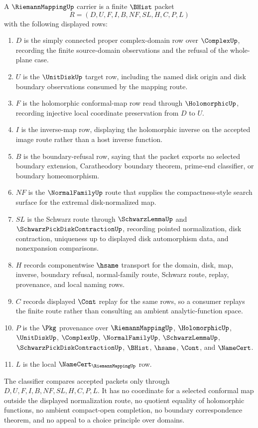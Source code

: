 \begin{definition}
\label{def:riemann-mapping-carrier}
A $\RiemannMappingUp$ carrier is a finite $\BHist$ packet
$$
R=(D,U,F,I,B,NF,SL,H,C,P,L)
$$
with the following displayed rows:
\begin{enumerate}
\item $D$ is the simply connected proper complex-domain row over $\ComplexUp$, recording the finite source-domain observations and the refusal of the whole-plane case.
\item $U$ is the $\UnitDiskUp$ target row, including the named disk origin and disk boundary observations consumed by the mapping route.
\item $F$ is the holomorphic conformal-map row read through $\HolomorphicUp$, recording injective local coordinate preservation from $D$ to $U$.
\item $I$ is the inverse-map row, displaying the holomorphic inverse on the accepted image route rather than a host inverse function.
\item $B$ is the boundary-refusal row, saying that the packet exports no selected boundary extension, Caratheodory boundary theorem, prime-end classifier, or boundary homeomorphism.
\item $NF$ is the $\NormalFamilyUp$ route that supplies the compactness-style search surface for the extremal disk-normalized map.
\item $SL$ is the Schwarz route through $\SchwarzLemmaUp$ and $\SchwarzPickDiskContractionUp$, recording pointed normalization, disk contraction, uniqueness up to displayed disk automorphism data, and nonexpansion comparisons.
\item $H$ records componentwise $\hsame$ transport for the domain, disk, map, inverse, boundary refusal, normal-family route, Schwarz route, replay, provenance, and local naming rows.
\item $C$ records displayed $\Cont$ replay for the same rows, so a consumer replays the finite route rather than consulting an ambient analytic-function space.
\item $P$ is the $\Pkg$ provenance over $\RiemannMappingUp$, $\HolomorphicUp$, $\UnitDiskUp$, $\ComplexUp$, $\NormalFamilyUp$, $\SchwarzLemmaUp$, $\SchwarzPickDiskContractionUp$, $\BHist$, $\hsame$, $\Cont$, and $\NameCert$.
\item $L$ is the local $\NameCert_{\RiemannMappingUp}$ row.
\end{enumerate}
The classifier compares accepted packets only through $D,U,F,I,B,NF,SL,H,C,P,L$. It has no coordinate for a selected conformal map outside the displayed normalization route, no quotient equality of holomorphic functions, no ambient compact-open completion, no boundary correspondence theorem, and no appeal to a choice principle over domains.
\end{definition}

